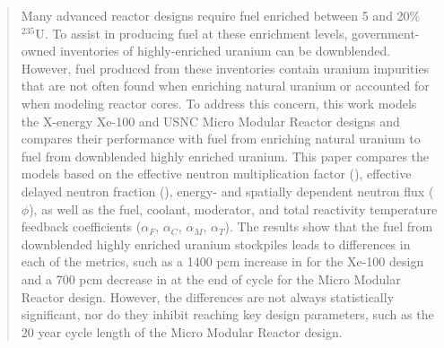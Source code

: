 \begin{abstract}
Many advanced reactor designs require fuel enriched 
between 5 and 20\% $^{235}$U. To assist in producing 
fuel at these enrichment levels, government-owned 
inventories of highly-enriched uranium can be downblended. However, 
fuel produced from these inventories contain uranium 
impurities that are not often found when enriching natural 
uranium or accounted for when modeling reactor cores. To 
address this concern, this work models the X-energy Xe-100 and 
USNC Micro Modular Reactor 
designs and compares their performance with  
fuel from enriching natural uranium to fuel from downblended 
highly enriched uranium. This paper compares the models based on 
the effective neutron 
multiplication factor (\keff), effective delayed 
neutron fraction (\betaEff), energy- and spatially dependent 
neutron flux ($\phi$), as well as the fuel, coolant, moderator, and total reactivity 
temperature feedback coefficients ($\alpha_F$, $\alpha_C$, 
$\alpha_M$, $\alpha_T$). The results 
show that the fuel from downblended highly enriched uranium 
stockpiles leads to differences in each of the metrics, such as
a 1400 pcm increase in \keff for the Xe-100 design and a 700 pcm 
decrease in \keff at the end of cycle for the Micro Modular 
Reactor design.
However, the differences are not always statistically significant, 
nor do they inhibit reaching key design 
parameters, such as the 20 year cycle length of the Micro Modular 
Reactor design. 
\end{abstract}
